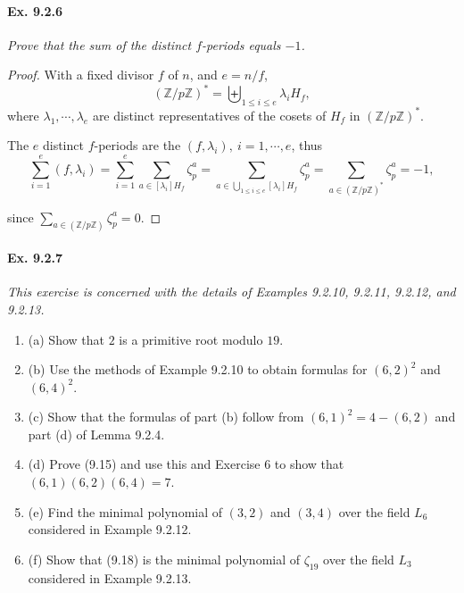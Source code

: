\documentclass[11pt,a4paper]{article}
\newcommand{\be} {\begin{enumerate}}
\newcommand{\ee} {\end{enumerate}}
\newcommand{\Z}{\mathbb{Z}}
\begin{document}
\paragraph{Ex. 9.2.6}

{\it Prove that the sum of the distinct $f$-periods equals $-1$.
}

\begin{proof}
With a fixed divisor $f$ of $n$, and $e = n/f$,  
$$(\Z/p\Z)^* = \biguplus_{1\leq i \leq e} \lambda_i H_f,$$ 
where $\lambda_1,\cdots,\lambda_e$ are distinct representatives of the cosets of $H_f$ in $(\Z/p\Z)^*$.

The $e$ distinct $f$-periods are the $(f,\lambda_i),\ i=1,\cdots,e$, thus  
$$\sum_{i=1}^e (f,\lambda_i) = \sum_{i=1}^e \sum_{a\in [\lambda_i] H_f} \zeta_p^a =  \sum_{a\in \bigcup_{1\leq i \leq e} [\lambda_i] H_f} \zeta_p^a = \sum_{a\in (\Z/p\Z)^*} \zeta_p^a = -1,$$

since $\sum_{a\in (\Z/p\Z)} \zeta_p^a = 0$.
\end{proof}

\paragraph{Ex. 9.2.7}

{\it This exercise is concerned with the details of Examples 9.2.10, 9.2.11, 9.2.12, and 9.2.13.
\be
\item[(a)] Show that $2$ is a primitive root modulo $19$.
\item[(b)] Use the methods of Example 9.2.10 to obtain formulas for $(6,2)^2$ and $(6,4)^2$.
\item[(c)] Show that the formulas of part (b) follow from $(6,1)^2 = 4 -(6,2)$ and part (d) of Lemma 9.2.4.
\item[(d)] Prove (9.15) and use this and Exercise 6 to show that $(6,1)(6,2)(6,4) = 7$.
\item[(e)] Find the minimal polynomial of $(3,2)$ and $(3,4)$ over the field $L_6$ considered in Example 9.2.12.
\item[(f)] Show that (9.18) is the minimal polynomial of $\zeta_{19}$ over the field $L_3$ considered in Example 9.2.13.
\ee
}
\end{document}
